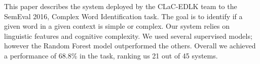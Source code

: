 This paper describes the system deployed by the CLaC-EDLK team to the SemEval 2016, Complex Word Identification task. The goal is to identify if a given word in a given context is simple or complex. Our system relies on linguistic features and cognitive complexity. We used several supervised models; however the Random Forest model outperformed the others. Overall we achieved a performance of 68.8\% in the task, ranking us 21 out of 45 systems.
